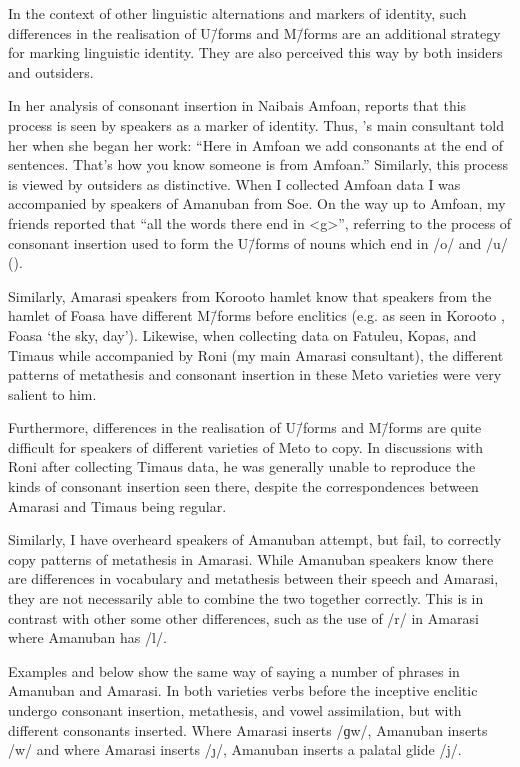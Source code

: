 In the context of other linguistic alternations and markers of identity,
such differences in the realisation of U\=/forms and M\=/forms
are an additional strategy for marking linguistic identity.
They are also perceived this way by both insiders and outsiders.

In her analysis of consonant insertion in Nai{\Q}bais Amfo{\Q}an,
\cite{cu18} reports that this process is seen by
speakers as a marker of identity.
Thus, \citeauthor{cu18}'s main consultant told her when she began her work:
{``Here in Amfo{\Q}an we add consonants at the end of sentences.
That's how you know someone is from Amfo{\Q}an.''}
Similarly, this process is viewed by outsiders as distinctive.
When I collected Amfo{\Q}an data I was accompanied
by speakers of Amanuban from So{\Q}e.
On the way up to Amfo{\Q}an, my friends reported
that ``all the words there end in <g>'',
referring to the process of consonant insertion used to form the U\=/forms
of nouns which end in /o/ and /u/ ().

Similarly, Amarasi speakers from Koro{\Q}oto
hamlet know that speakers from the hamlet of Fo{\Q}asa{\Q} have different M\=/forms before enclitics
(e.g. as seen in Koro{\Q}oto , Fo{\Q}asa{\Q}  `the sky, day').
Likewise, when collecting data on Fatule{\Q}u, Kopas, and Timaus while accompanied
by Roni (my main Amarasi consultant), the different patterns
of metathesis and consonant insertion in these
Meto varieties were very salient to him.

Furthermore, differences in the realisation of U\=/forms and M\=/forms
are quite difficult for speakers of different varieties of Meto to copy.
In discussions with Roni after collecting Timaus data, he was generally unable to reproduce
the kinds of consonant insertion seen there, despite the correspondences
between Amarasi and Timaus being regular.

Similarly, I have overheard speakers of Amanuban
attempt, but fail, to correctly copy patterns of metathesis in Amarasi.
While Amanuban speakers know there are differences in
vocabulary and metathesis between their speech and Amarasi,
they are not necessarily able to combine the two together correctly.
This is in contrast with other some other differences,
such as the use of /r/ in Amarasi where Amanuban has /l/.

\largerpage
Examples  and  below
show the same way of saying a number of phrases in Amanuban and Amarasi.
In both varieties verbs before the inceptive enclitic  undergo consonant insertion,
metathesis, and vowel assimilation, but with different consonants inserted.
Where Amarasi inserts /ɡw/, Amanuban inserts /w/
and where Amarasi inserts /\j/, Amanuban inserts a palatal glide /j/.

